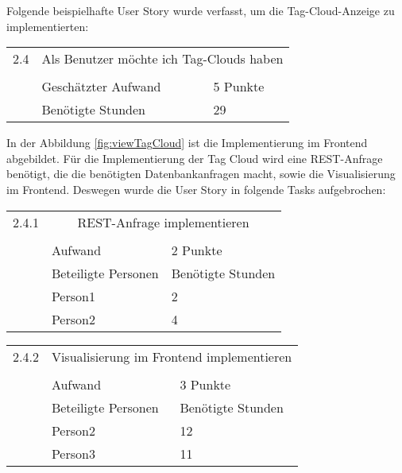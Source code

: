 Folgende beispielhafte User Story wurde verfasst, um die Tag-Cloud-Anzeige zu implementierten:
\begin{center}
\begin{tabular}{|lll|} \hline
2.4 & \multicolumn{2}{c|}{Als Benutzer möchte ich Tag-Clouds haben} \\
    &                     &           \\
    & \small{Geschätzter Aufwand} & \small{5 Punkte}  \\
    & \small{Benötigte Stunden} & \small{29}     \\ \hline
\end{tabular}
\end{center}
In der Abbildung \ref{fig:viewTagCloud} ist die Implementierung im Frontend abgebildet.
Für die Implementierung der Tag Cloud wird eine REST-Anfrage benötigt, die die benötigten
Datenbank\-anfragen macht, sowie die 
Visualisierung im Frontend.
Deswegen wurde die User Story in folgende Tasks aufgebrochen:
\begin{center}
\begin{tabular}{|lll|} \hline
2.4.1 & \multicolumn{2}{c|}{REST-Anfrage implementieren} \\
    &                     &           \\
    & \small{Aufwand} & \small{2 Punkte}  \\ \cline{2-3}
    & \multicolumn{1}{|l}{\small{Beteiligte Personen}} & \small{Benötigte Stunden} \\ 
    & \multicolumn{1}{|l}{\small{Person1}}             & \small{2}                    \\
    & \multicolumn{1}{|l}{\small{Person2}}             & \small{4}                    \\
\hline
\end{tabular}
\end{center}
\begin{center}
\begin{tabular}{|lll|} \hline
2.4.2 & \multicolumn{2}{c|}{Visualisierung im Frontend implementieren} \\
    &                     &           \\
    & \small{Aufwand} & \small{3 Punkte}  \\ \cline{2-3}
    & \multicolumn{1}{|l}{\small{Beteiligte Personen}} & \small{Benötigte Stunden} \\ 
    & \multicolumn{1}{|l}{\small{Person2}}             & \small{12}                    \\
    & \multicolumn{1}{|l}{\small{Person3}}             & \small{11}                    \\
\hline
\end{tabular}
\end{center}

